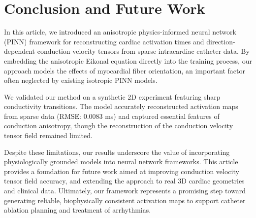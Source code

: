 \section{Conclusion and Future Work}

In this article, we introduced an anisotropic physics-informed neural network (PINN) framework for reconstructing cardiac activation times and direction-dependent conduction velocity tensors from sparse intracardiac catheter data. By embedding the anisotropic Eikonal equation directly into the training process, our approach models the effects of myocardial fiber orientation, an important factor often neglected by existing isotropic PINN models.

We validated our method on a synthetic 2D experiment featuring sharp conductivity transitions. The model accurately reconstructed activation maps from sparse data (RMSE: 0.0083 ms) and captured essential features of conduction anisotropy, though the reconstruction of the conduction velocity tensor field remained limited.

Despite these limitations, our results underscore the value of incorporating physiologically grounded models into neural network frameworks. This article provides a foundation for future work aimed at improving conduction velocity tensor field accuracy, and extending the approach to real 3D cardiac geometries and clinical data. Ultimately, our framework represents a promising step toward generating reliable, biophysically consistent activation maps to support catheter ablation planning and treatment of arrhythmias.